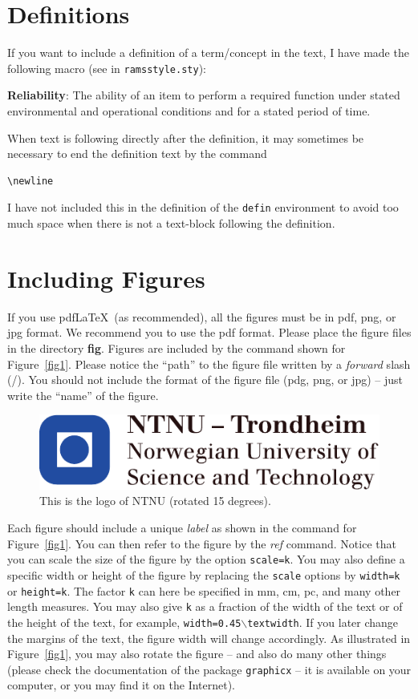 \section*{Definitions}
If you want to include a definition of a term/concept in the text, I have made the following macro (see in \texttt{ramsstyle.sty}):
\begin{defin}
\textbf{Reliability}: The ability of an item to perform a required function under stated environmental and operational conditions and for a stated period of time.\newline
\end{defin}
When text is following directly after the definition, it may sometimes be necessary to end the definition text by the command
\begin{verbatim}
\newline
\end{verbatim}
I have not included this in the definition of the \texttt{defin} environment to avoid too much space when there is not a text-block following the definition.
\section{Including Figures}
If you use pdf\LaTeX\ (as recommended), all the figures must be in pdf, png, or jpg format. We recommend you to use the pdf format.  Please place the figure files in the directory \textbf{fig}. Figures are included by the command shown for Figure~\ref{fig1}. Please notice the ``path'' to the figure file written by a \emph{forward} slash (/). You should not include the format of the figure file (pdg, png, or jpg) -- just write the ``name'' of the figure. 
\begin{figure}
\centering
\includegraphics[scale=0.6,angle=15]{fig/NTNU}
\caption{This is the logo of NTNU (rotated 15 degrees).}
\label{fig3}
\end{figure}

Each figure should include a unique \emph{label} as shown in the command for Figure~\ref{fig1}. You can then refer to the figure by the \emph{ref} command.
Notice that you can scale the size of the figure by the option \texttt{scale=k}. You may also define a specific width or height of the figure by replacing the \texttt{scale} options by \texttt{width=k} or \texttt{height=k}. The factor \texttt{k} can here be specified in mm, cm, pc, and many other length measures. You may also give \texttt{k} as a fraction of the width of the text or of the height of the text, for example, \texttt{width=0.45$\backslash$textwidth}. If you later change the margins of the text, the figure width will change accordingly. As illustrated in Figure~\ref{fig1}, you may also rotate the figure -- and also do many other things (please check the documentation of the package \texttt{graphicx} -- it is available on your computer, or you may find it on the Internet).

